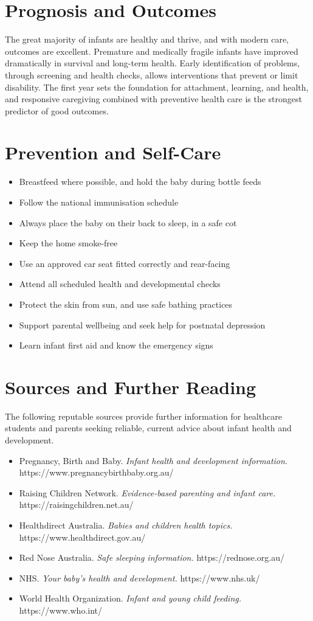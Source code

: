 \section*{Prognosis and Outcomes}
The great majority of infants are healthy and thrive, and with modern care, outcomes are excellent. Premature and medically fragile infants have improved dramatically in survival and long-term health. Early identification of problems, through screening and health checks, allows interventions that prevent or limit disability. The first year sets the foundation for attachment, learning, and health, and responsive caregiving combined with preventive health care is the strongest predictor of good outcomes.

\section*{Prevention and Self-Care}
\begin{itemize}
    \item Breastfeed where possible, and hold the baby during bottle feeds
    \item Follow the national immunisation schedule
    \item Always place the baby on their back to sleep, in a safe cot
    \item Keep the home smoke-free
    \item Use an approved car seat fitted correctly and rear-facing
    \item Attend all scheduled health and developmental checks
    \item Protect the skin from sun, and use safe bathing practices
    \item Support parental wellbeing and seek help for postnatal depression
    \item Learn infant first aid and know the emergency signs
\end{itemize}

\section*{Sources and Further Reading}
The following reputable sources provide further information for healthcare students and parents seeking reliable, current advice about infant health and development.
\begin{itemize}
    \item Pregnancy, Birth and Baby. \textit{Infant health and development information.} https://www.pregnancybirthbaby.org.au/
    \item Raising Children Network. \textit{Evidence-based parenting and infant care.} https://raisingchildren.net.au/
    \item Healthdirect Australia. \textit{Babies and children health topics.} https://www.healthdirect.gov.au/
    \item Red Nose Australia. \textit{Safe sleeping information.} https://rednose.org.au/
    \item NHS. \textit{Your baby's health and development.} https://www.nhs.uk/
    \item World Health Organization. \textit{Infant and young child feeding.} https://www.who.int/
\end{itemize}
